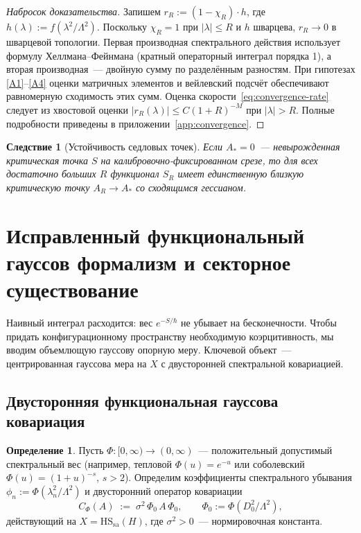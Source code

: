 \documentclass[12pt,a4paper]{article}
\theoremstyle{plain}
\newtheorem{corollary}[theorem]{Следствие}
\theoremstyle{definition}
\newtheorem{definition}[theorem]{Определение}
\theoremstyle{remark}
\newcommand{\HS}{\mathrm{HS}}
\newcommand{\sa}{\mathrm{sa}}
\newcommand{\Lam}{\Lambda}
\begin{document}
\begin{proof}[Набросок доказательства]
Запишем $r_R := (1-\chi_R)\cdot h$, где $h(\lambda) :=
f(\lambda^2/\Lam^2)$.  Поскольку $\chi_R = 1$ при $|\lambda| \le R$
и $h$ шварцева, $r_R \to 0$ в шварцевой топологии.  Первая
производная спектрального действия использует формулу
Хеллмана--Фейнмана (кратный операторный интеграл порядка 1),
а вторая производная~--- двойную сумму по разделённым разностям.
При гипотезах \ref{A1}--\ref{A4} оценки матричных элементов и
вейлевский подсчёт обеспечивают равномерную сходимость этих сумм.
Оценка скорости~\eqref{eq:convergence-rate} следует из хвостовой
оценки $|r_R(\lambda)| \le C(1+R)^{-M}$ при $|\lambda| > R$.
Полные подробности приведены в приложении~\ref{app:convergence}.
\end{proof}

\begin{corollary}[Устойчивость седловых точек]
\label{cor:saddle-persistence}
Если $A_* = 0$~--- невырожденная критическая точка $S$ на
калибровочно-фиксированном срезе, то для всех достаточно больших
$R$ функционал $S_R$ имеет единственную близкую критическую точку
$A_R \to A_*$ со сходящимся гессианом.
\end{corollary}

\section{Исправленный функциональный гауссов формализм и секторное существование}
\label{sec:gaussian}

Наивный интеграл расходится: вес $e^{-S/\hbar}$ не убывает на бесконечности. Чтобы придать конфигурационному пространству необходимую коэрцитивность, мы вводим объемлющую гауссову опорную меру. Ключевой объект~--- центрированная гауссова мера на $X$ с двусторонней спектральной ковариацией.

\subsection{Двусторонняя функциональная гауссова ковариация}

\begin{definition}\label{def:covariance}
Пусть $\Phi\colon [0,\infty) \to (0,\infty)$~--- положительный
допустимый спектральный вес (например, тепловой
$\Phi(u) = e^{-u}$ или соболевский $\Phi(u) = (1+u)^{-s}$,
$s > 2$).  Определим коэффициенты спектрального убывания
$\phi_n := \Phi(\lambda_n^2/\Lam^2)$ и двусторонний оператор
ковариации
\begin{equation}\label{eq:covariance}
  C_\Phi(A) \;:=\; \sigma^2\, \Phi_0\, A\, \Phi_0,
  \qquad \Phi_0 := \Phi(D_0^2/\Lam^2),
\end{equation}
действующий на $X = \HS_\sa(H)$, где $\sigma^2 > 0$~---
нормировочная константа.
\end{definition}
\end{document}
